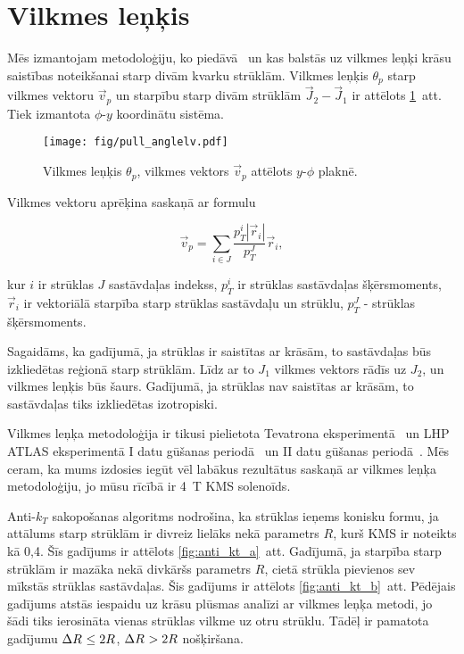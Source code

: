 \section{Vilkmes leņķis}

Mēs izmantojam metodoloģiju, ko piedāvā~\cite{Gallicchio:2010sw} un kas balstās uz vilkmes leņķi krāsu saistības noteikšanai starp divām kvarku strūklām. Vilkmes leņķis $\theta_{p}$ starp vilkmes vektoru $\vec{v}_{p}$ un starpību starp divām strūklām $\vec{J}_{2}-\vec{J}_{1}$ ir attēlots \ref{fig:pull_angle}~att. Tiek izmantota $\phi$-$y$ koordinātu sistēma. 

\begin{figure}[hbtp]
  \centering
  \texttt{[image: fig/pull\_anglelv.pdf]}
  \caption{Vilkmes leņķis $\theta_{p}$, vilkmes vektors $\vec{v}_{p}$ attēlots $y$-$\phi$ plaknē.}
  \label{fig:pull_angle}
\end{figure}

Vilkmes vektoru aprēķina saskaņā ar formulu

\begin{equation}
  \vec{v}_{p}=\sum_{i\in J}\frac{p^{i}_{T}|\vec{r}_{i}|}{p^{J}_{T}}\vec{r}_{i},
  \label{Eq:pull_angle}
\end{equation}

kur $i$ ir strūklas $J$ sastāvdaļas indekss, $p^{i}_{T}$ ir strūklas sastāvdaļas šķērsmoments, $\vec{r}_{i}$ ir vektoriālā starpība starp strūklas sastāvdaļu un strūklu, $p^{J}_{T}$ - strūklas šķērsmoments.

Sagaidāms, ka gadījumā, ja strūklas ir saistītas ar krāsām, to sastāvdaļas būs izkliedētas reģionā starp strūklām. Līdz ar to $J_{1}$ vilkmes vektors rādīs uz $J_{2}$, un vilkmes leņķis būs šaurs. Gadījumā, ja strūklas nav saistītas ar krāsām, to sastāvdaļas tiks izkliedētas izotropiski.

Vilkmes leņķa metodoloģija ir tikusi pielietota Tevatrona \DZERO eksperimentā~\cite{Abazov:2011vh} un LHP ATLAS eksperimentā I datu gūšanas periodā~\cite{Aad:2015lxa} un II datu gūšanas periodā~\cite{ATLAS:2017iaz}. Mēs ceram, ka mums izdosies iegūt vēl labākus rezultātus saskaņā ar vilkmes leņķa metodoloģiju, jo mūsu rīcībā ir 4~T KMS solenoīds.

Anti-$k_{T}$ \gls{sakopošanas} algoritms nodrošina, ka strūklas ieņems konisku formu, ja attālums starp strūklām \DeltaR ir divreiz lielāks nekā parametrs $R$, kurš KMS ir noteikts kā 0,4. Šīs gadījums ir attēlots \ref{fig:anti_kt_a}~att. Gadījumā, ja starpība starp strūklām \DeltaR ir mazāka nekā divkāršs parametrs $R$, \gls{cietā} strūkla pievienos sev mīkstās strūklas sastāvdaļas. Šis gadījums ir attēlots \ref{fig:anti_kt_b}~att. Pēdējais gadījums atstās iespaidu uz krāsu plūsmas analīzi ar vilkmes leņķa metodi, jo šādi tiks ierosināta vienas strūklas vilkme uz otru strūklu. Tādēļ ir pamatota gadījumu $\Delta R^{}\leq2R$, $\Delta R^{}>2R$ nošķiršana. 

